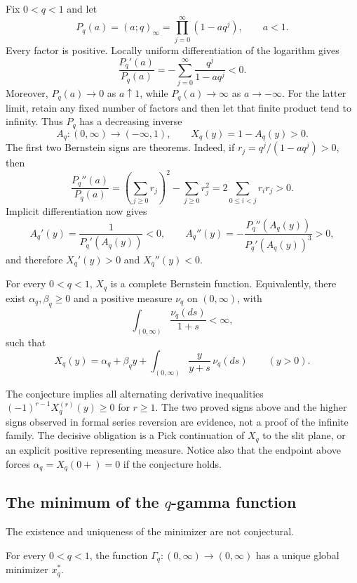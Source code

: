Fix \(0<q<1\) and let
\[
 P_q(a)=(a;q)_\infty=\prod_{j=0}^{\infty}(1-aq^j),
 \qquad a<1.
\]
Every factor is positive.  Locally uniform differentiation of the logarithm
gives
\[
 \frac{P_q'(a)}{P_q(a)}
  =-\sum_{j=0}^{\infty}\frac{q^j}{1-aq^j}<0.
\]
Moreover, \(P_q(a)\to0\) as \(a\uparrow1\), while
\(P_q(a)\to\infty\) as \(a\to-\infty\).  For the latter limit, retain any
fixed number of factors and then let that finite product tend to infinity.
Thus \(P_q\) has a decreasing inverse
\[
 A_q:(0,\infty)\longrightarrow(-\infty,1),
 \qquad
 X_q(y)=1-A_q(y)>0.
\]
The first two Bernstein signs are theorems.  Indeed, if
\(r_j=q^j/(1-aq^j)>0\), then
\[
 \frac{P_q''(a)}{P_q(a)}
  =\left(\sum_{j\ge0}r_j\right)^2-\sum_{j\ge0}r_j^2
  =2\sum_{0\le i<j}r_ir_j>0.
\]
Implicit differentiation now gives
\[
 A_q'(y)=\frac1{P_q'(A_q(y))}<0,\qquad
 A_q''(y)
  =-\frac{P_q''(A_q(y))}{P_q'(A_q(y))^3}>0,
\]
and therefore \(X_q'(y)>0\) and \(X_q''(y)<0\).

\begin{conjecture}
\label{conj:complete-bernstein-principal-inverse}
For every \(0<q<1\), \(X_q\) is a complete Bernstein function.  Equivalently,
there exist \(\alpha_q,\beta_q\ge0\) and a positive measure \(\nu_q\) on
\((0,\infty)\), with
\[
 \int_{(0,\infty)}\frac{\nu_q(ds)}{1+s}<\infty,
\]
such that
\[
 X_q(y)=\alpha_q+\beta_qy+
        \int_{(0,\infty)}\frac{y}{y+s}\,\nu_q(ds)
 \qquad (y>0).
\]
\end{conjecture}

The conjecture implies all alternating derivative inequalities
\((-1)^{r-1}X_q^{(r)}(y)\ge0\) for \(r\ge1\).  The two proved signs above and
the higher signs observed in formal series reversion are evidence, not a
proof of the infinite family.  The decisive obligation is a Pick continuation
of \(X_q\) to the slit plane, or an explicit positive representing measure.
Notice also that the endpoint above forces
\(\alpha_q=X_q(0+)=0\) if the conjecture holds.

\subsection{\texorpdfstring{The minimum of the \(q\)-gamma function}{The minimum of the q-gamma function}}

The existence and uniqueness of the minimizer are not conjectural.

\begin{theorem}
\label{thm:qgamma-unique-minimum}
For every \(0<q<1\), the function
\(\Gamma_q:(0,\infty)\to(0,\infty)\) has a unique global minimizer
\(x_q^\ast\).
\end{theorem}

